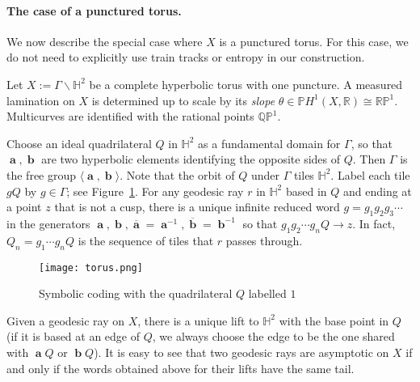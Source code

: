 \documentclass[11pt]{article} %
\theoremstyle{plain}
\theoremstyle{definition}
\DeclareMathOperator{\bolda}{\mathbf{a}}
\DeclareMathOperator{\boldb}{\mathbf{b}}
\numberwithin{equation}{section}
\begin{document}
\paragraph{The case of a punctured torus.}
We now describe the special case where $X$ is a punctured torus. For this case, we do not need to explicitly use train tracks or entropy in our construction.

Let $X:=\Gamma\backslash\mathbb{H}^2$ be a complete hyperbolic torus with one puncture. A measured lamination on $X$ is determined up to scale by its \emph{slope} $\theta\in\mathbb{P}H^1(X,\mathbb{R})\cong\mathbb{RP}^1$. Multicurves are identified with the rational points $\mathbb{QP}^1$.

Choose an ideal quadrilateral $Q$ in $\mathbb{H}^2$ as a fundamental domain for $\Gamma$, so that $\bolda, \boldb$ are two hyperbolic elements identifying the opposite sides of $Q$. Then $\Gamma$ is the free group $\langle \bolda,\boldb\rangle$. Note that the orbit of $Q$ under $\Gamma$ tiles $\mathbb{H}^2$. Label each tile $gQ$ by $g\in\Gamma$; see Figure~\ref{fig:symbolic_coding}. For any geodesic ray $r$ in $\mathbb{H}^2$ based in $Q$ and ending at a point $z$ that is not a cusp, there is a unique infinite reduced word $g=g_1g_2g_3\cdots$ in the generators $\bolda,\boldb,\overline{\bolda}=\bolda^{-1},\overline{\boldb}=\boldb^{-1}$ so that $g_1g_2\cdots g_nQ\to z$. In fact, $Q_n=g_1\cdots g_nQ$ is the sequence of tiles that $r$ passes through.

\begin{figure}[ht!]
    \centering
    \texttt{[image: torus.png]}
    \caption{Symbolic coding with the quadrilateral $Q$ labelled $1$}
    \label{fig:symbolic_coding}
\end{figure}

Given a geodesic ray on $X$, there is a unique lift to $\mathbb{H}^2$ with the base point in $Q$ (if it is based at an edge of $Q$, we always choose the edge to be the one shared with $\bolda Q$ or $\boldb Q$). It is easy to see that two geodesic rays are asymptotic on $X$ if and only if the words obtained above for their lifts have the same tail.
\end{document}

